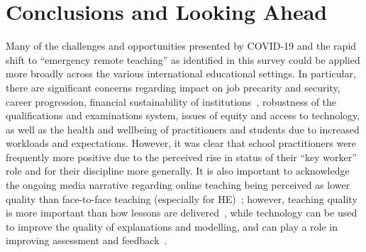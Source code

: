 \documentclass[conference]{IEEEtran}
\begin{document}

\section{Conclusions and Looking Ahead}\label{conclusions}

Many of the challenges and opportunities presented by COVID-19 and the
rapid shift to ``emergency remote teaching'' as identified in this
survey could be applied more broadly across the various international
educational settings. In particular, there are significant concerns
regarding impact on job precarity and security, career progression,
financial sustainability of
institutions~\cite{watermeyer-et-al:he2020}, robustness of the
qualifications and examinations system, issues of equity and access to
technology, as well as the health and wellbeing of practitioners and
students due to increased workloads and expectations. However, it was
clear that school practitioners were frequently more positive due to
the perceived rise in status of their ``key worker'' role and for
their discipline more generally. It is also important to acknowledge
the ongoing media narrative regarding online teaching being perceived
as lower quality than face-to-face teaching (especially for
HE)~\cite{paechter+maier:ihe2010,scbbcnews:2020}; however, teaching
quality is more important than how lessons are
delivered~\cite{eefremote:2020}, while technology can be used to
improve the quality of explanations and modelling, and can play a role
in improving assessment and feedback~\cite{eefdigtech:2019}.
\end{document}
